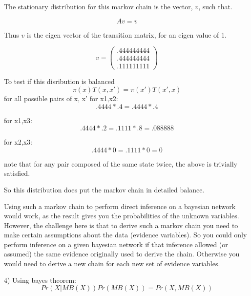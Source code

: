 \documentclass[12pt]{article}
\begin{document}
The stationary distribution for this markov chain is the vector, $v$, such that. 

\begin{equation}
   Av = v
\end{equation}

Thus $v$ is the eigen vector of the transition matrix, for an eigen value of 1. 

\begin{equation}
    v = \left(\begin{array}{c}
    .444444444 \\
    .444444444 \\
    .111111111 \end{array} \right)
\end{equation}

To test if this disribution is balanced
\begin{equation}
     \pi(x)T(x,x') = \pi(x')T(x',x)
\end{equation}
for all possible pairs of x, x'
for x1,x2: 
\begin{equation}
     .4444*.4 = .4444*.4
\end{equation}

for x1,x3: 
\begin{equation}
     .4444*.2 = .1111*.8 = .088888
\end{equation}

for x2,x3: 
\begin{equation}
     .4444*0 = .1111*0 = 0
\end{equation}

note that for any pair composed of the same state twice, the above is trivially satisfied. 

So this distribution does put the markov chain in detailed balance. 

Using such a markov chain to perform direct inference on a bayesian network would work, as the result 
gives you the probabilities of the unknown variables. However, the challenge here is that to derive such a 
markov chain you need to make certain assumptions about the data (evidence variables). So you could only 
perform inference on a given bayesian network if that inference allowed (or assumed) the same evidence 
originally used to derive the chain. Otherwise you would need to derive a new chain for each new set of 
evidence variables. 

\pagebreak
\setcounter{equation}{0}
4) Using bayes theorem:
\begin{equation}
    Pr(X|MB(X))Pr(MB(X)) = Pr(X,MB(X))
\end{equation}
\end{document}
